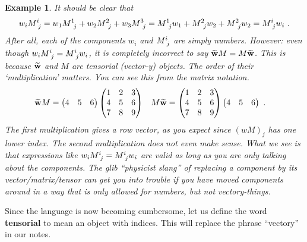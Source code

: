 \documentclass[12pt]{article}
\newtheorem{example}{Example}[section]
\begin{document}
\begin{example}\label{eg:moving:coefficients:around}
It should be clear that
\begin{align}
    w_i M\aij{i}{j} = 
    w_1 M\aij{1}{j} + w_2 M\aij{2}{j} + w_3 M\aij{3}{j}
    = 
    M\aij{1}{j}w_1  + M\aij{2}{j}w_2 + M\aij{2}{j}w_2
    =
    M\aij{i}{j}w_i \ .
\end{align}
After all, each of the components $w_i$ and $M\aij{i}{j}$ are simply numbers. However: even though $w_i M\aij{i}{j} = M\aij{i}{j}w_i$, it is \emph{completely incorrect} to say $\widetilde{\mathbf{w}}M = M\widetilde{\mathbf{w}}$. This is because $\widetilde{\mathbf{w}}$ and $M$ are \emph{tensorial} (vector-y) objects. The order of their `multiplication' matters. You can see this from the matrix notation.
\begin{align}
    \widetilde{\mathbf{w}}M &= 
    \begin{pmatrix}
        4&5&6
    \end{pmatrix}
    \begin{pmatrix}
        1 & 2 & 3 \\
        4 & 5 & 6 \\
        7 & 8 & 9
    \end{pmatrix}
    &
    M\widetilde{\mathbf{w}} &=
    \begin{pmatrix}
        1 & 2 & 3 \\
        4 & 5 & 6 \\
        7 & 8 & 9
    \end{pmatrix}
    \begin{pmatrix}
        4&5&6
    \end{pmatrix} \ .
\end{align}
The first multiplication gives a row vector, as you expect since $(wM)_j$ has one lower index. The second multiplication does not even make sense. What we see is that expressions like $w_i M\aij{i}{j} = M\aij{i}{j}w_i$ are valid as long as you are only talking about the components. The glib ``physicist slang'' of replacing a component by its vector/matrix/tensor can get you into trouble if you have moved components around in a way that is only allowed for numbers, but not vectory-things.
\end{example}

Since the language is now becoming cumbersome, let us define the word \textbf{tensorial} to mean an object with indices. This will replace the phrase ``vectory'' in our notes.
\end{document}
